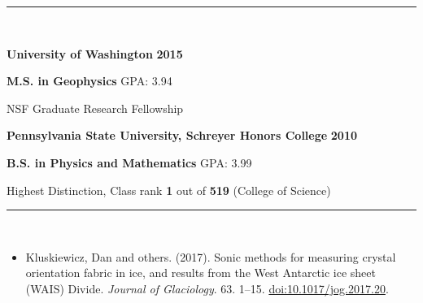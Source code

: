 \documentclass[10pt]{article}
\begin{document}
\vspace{1.5mm}
\noindent
\rule{\textwidth}{0.4pt}\\
\vspace{1.5mm}


\noindent
\textbf{University of Washington} \hfill \textbf{2015}

\noindent
\textbf{M.S. in Geophysics} \hfill GPA: 3.94

\noindent
\hfill NSF Graduate Research Fellowship

\vspace{1mm}
\noindent
\textbf{Pennsylvania State University, Schreyer Honors College} \hfill \textbf{2010}

\noindent
\textbf{B.S. in Physics and Mathematics} \hfill GPA: 3.99

\noindent
\hfill Highest Distinction, Class rank \textbf{1} out of \textbf{519} (College of Science)

\vspace{1.5mm}
\noindent
\rule{\textwidth}{0.4pt}\\
\vspace{1.5mm}

\begin{itemize}
\item Kluskiewicz, Dan and others. (2017). Sonic methods for measuring crystal orientation fabric in ice, and results from the West Antarctic ice sheet (WAIS) Divide. \textit{Journal of Glaciology}. 63. 1--15. \href{https://doi.org/10.1017/jog.2017.20}{doi:10.1017/jog.2017.20}.
\end{itemize}
\end{document}
